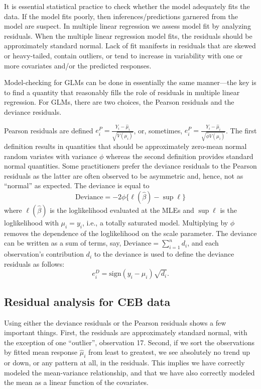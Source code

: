 \documentclass[
]{book}
\begin{document}
It is essential statistical practice to check whether the model adequately fits the data. If the model fits poorly, then inferences/predictions garnered from the model are suspect. In multiple linear regression we assess model fit by analyzing residuals. When the multiple linear regression model fits, the residuals should be approximately standard normal. Lack of fit manifests in residuals that are skewed or heavy-tailed, contain outliers, or tend to increase in variability with one or more covariates and/or the predicted responses.

Model-checking for GLMs can be done in essentially the same manner---the key is to find a quantity that reasonably fills the role of residuals in multiple linear regression. For GLMs, there are two choices, the Pearson residuals and the deviance residuals.

Pearson residuals are defined \(e^P_i = \frac{Y_i - \hat\mu_i}{\sqrt{V(\mu_i)}}\), or, sometimes, \(e^P_i = \frac{Y_i - \hat\mu_i}{\sqrt{\hat\phi V(\mu_i)}}\). The first definition results in quantities that should be approximately zero-mean normal random variates with variance \(\phi\) whereas the second definition provides standard normal quantities. Some practitioners prefer the deviance residuals to the Pearson residuals as the latter are often observed to be asymmetric and, hence, not as ``normal'' as expected. The deviance is equal to
\[\text{Deviance} = -2\phi\{\ell(\hat\beta) - \sup \ell\}\]
where \(\ell(\hat\beta)\) is the loglikelihood evaluated at the MLEs and \(\sup \ell\) is the loglikelihood with \(\mu_i = y_i\), i.e., a totally saturated model. Multiplying by \(\phi\) removes the dependence of the loglikelihood on the scale parameter. The deviance can be written as a sum of terms, say, \(\text{Deviance} = \sum_{i=1}^n d_i\), and each observation's contribution \(d_i\) to the deviance is used to define the deviance residuals as follows:
\[e^D_i = \text{sign}(y_i - \mu_i)\sqrt{d_i}.\]

\hypertarget{residual-analysis-for-ceb-data}{%
\subsection{Residual analysis for CEB data}\label{residual-analysis-for-ceb-data}}

Using either the deviance residuals or the Pearson residuals shows a few important things. First, the residuals are approximately standard normal, with the exception of one ``outlier'', observation 17. Second, if we sort the observations by fitted mean response \(\hat\mu_i\) from least to greatest, we see absolutely no trend up or down, or any pattern at all, in the residuals. This implies we have correctly modeled the mean-variance relationship, and that we have also correctly modeled the mean as a linear function of the covariates.
\end{document}
